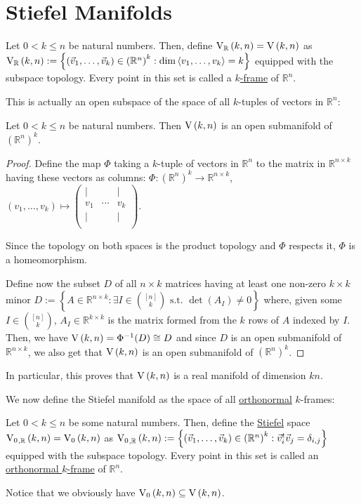 \section{Stiefel Manifolds}
\begin{definition} Let $0<k\leq n$ be natural numbers. Then, define $\St{k}{n}{\mathbb{R}}=\St{k}{n}$ as
$\St{k}{n}{\mathbb{R}}:=\left\{\left(\vec{v}_1,\ldots,\vec{v}_k\right)\in{\left(\mathbb{R}^n\right)}^k:\dim\left<v_1,\ldots,v_k\right>=k\right\}$
equipped with the subspace topology. Every point in this set is called a \ul{$k$-frame} of $\mathbb{R}^n$.
\end{definition}
This is actually an open subspace of the space of all $k$-tuples of vectors in $\mathbb{R}^n$:
\begin{proposition}\label{prop:St_open} Let $0<k\leq n$ be natural numbers. Then $\St{k}{n}$ is an open submanifold of ${\left(\mathbb{R}^n\right)}^k$.
\end{proposition}
\begin{proof} Define the map $\Phi$ taking a $k$-tuple of vectors in $\mathbb{R}^n$ to the matrix in $\mathbb{R}^{n\times k}$ having these vectors as columns:
$\Phi:{\left(\mathbb{R}^n\right)}^k\to \mathbb{R}^{n\times k}$,
$(v_1,\ldots,v_k)\mapsto \left(\begin{array}{ccc}
	|&&|\\[-.3em]
	v_1&\cdots&v_k\\[-.3em]
	|&&|\\
\end{array}\right)$.

Since the topology on both spaces is the product topology and $\Phi$ respects it, $\Phi$ is a homeomorphism.

Define now the subset $D$ of all $n\times k$ matrices having at least one non-zero $k\times k$ minor
$D:=\left\{A\in\mathbb{R}^{n\times k}:\exists I\in\binom{[n]}{k}\text{ s.t. }\det(A_I)\neq0\right\}$
where, given some $I\in\binom{[n]}{k}$, $A_I\in\mathbb{R}^{k\times k}$ is the matrix formed from the $k$ rows of $A$ indexed by $I$. Then, we have
$\St{k}{n}=\Phi^{-1}(D)\cong D$
and since $D$ is an open submanifold of $\mathbb{R}^{n\times k}$, we also get that $\St{k}{n}$ is an open submanifold of ${\left(\mathbb{R}^n\right)}^k$.
\end{proof}
\begin{remark} In particular, this proves that $\St{k}{n}$ is a real manifold of dimension $kn$.
\end{remark}

We now define the Stiefel manifold as the space of all \ul{orthonormal} $k$-frames:
\begin{definition} Let $0<k\leq n$ be some natural numbers. Then, define the \ul{Stiefel} space $\StO{k}{n}{\mathbb{R}}=\StO{k}{n}$ as
$\StO{k}{n}{\mathbb{R}}:=\left\{\left(\vec{v}_1,\ldots,\vec{v}_k\right)\in{\left(\mathbb{R}^n\right)}^k:\vec{v}_i^t\vec{v}_j=\delta_{i,j}\right\}$
equipped with the subspace topology. Every point in this set is called an \ul{orthonormal $k$-frame} of $\mathbb{R}^n$.
\end{definition}
Notice that we obviously have $\StO{k}{n}\subseteq\St{k}{n}$.

